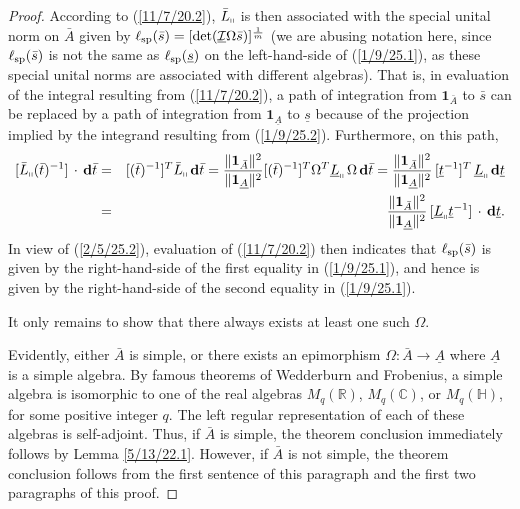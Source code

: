 \documentclass{amsart}
\theoremstyle{definition}
\numberwithin{theorem}{section}
\numberwithin{equation}{section}
\begin{document}
\begin{proof}
  According to (\ref{11/7/20.2}), $\bar{L}_{\shortparallel}$ is then associated with the special unital norm on $\bar{A}$ given by $\ell_{\rm sp}(\bar{s}) = [\text{det}(\underline{\mathcal{I}}\Omega\bar{s})]^{\frac{1}{m}}$ (we are abusing notation here, since $\ell_{\rm sp}(\bar{s})$ is not the same as $\ell_{\rm sp}(\underline{s})$ on the left-hand-side of (\ref{1/9/25.1}), as these special unital norms are associated with different algebras).  That is, in evaluation of the integral resulting from  (\ref{11/7/20.2}), a path of integration from $\mathbf{1}_{\bar{A}}$ to $\bar{s}$ can be replaced by a path of integration from $\mathbf{1}_{\underline{A}}$ to $\underline{s}$ because of the projection implied by the integrand resulting from (\ref{1/9/25.2}).   Furthermore, on this path,
  \begin{eqnarray}\nonumber  [\bar{L}_{\shortparallel}(\bar{t})^{-1}]\,\cdot\, \mathbf{d}\bar{t} &=& [(\bar{t})^{-1}]^T \bar{L}_{\shortparallel}\,\mathbf{d}\bar{t} =  \frac{\|\mathbf{1}_{\bar{A}}\|^2}{\|\mathbf{1}_{\underline{A}}\|^2}[(\bar{t})^{-1}]^T \Omega^T \underline{L}_{\shortparallel} \, \Omega \, \mathbf{d}\bar{t}  = \frac{\|\mathbf{1}_{\bar{A}}\|^2}{\|\mathbf{1}_{\underline{A}}\|^2}\,[\underline{t}^{-1}]^T\, \underline{L}_{\shortparallel}\,\mathbf{d}\underline{t} \\ &=& \frac{\|\mathbf{1}_{\bar{A}}\|^2}{\|\mathbf{1}_{\underline{A}}\|^2}\,[\underline{L}_{\shortparallel}\underline{t}^{-1}]\,\cdot\, \mathbf{d}\underline{t}.\label{2/5/25.2}\end{eqnarray}   In view of (\ref{2/5/25.2}), evaluation of (\ref{11/7/20.2}) then indicates that $\ell_{\rm sp}(\bar{s})$ is given by the right-hand-side of the first equality in (\ref{1/9/25.1}), and hence is given by the right-hand-side of the second equality in (\ref{1/9/25.1}). 
  

  It only remains to show that there always exists at least one such $\Omega$. 
  
  Evidently, either $\bar{A}$ is simple, or there exists an epimorphism $\Omega:\bar{A}\rightarrow \underline{A}$ where $ \underline{A}$ is a simple algebra.   By famous theorems of Wedderburn and Frobenius, a simple algebra is isomorphic to one of the real algebras $M_q(\mathbb{R})$, $M_q(\mathbb{C})$, or $M_q(\mathbb{H})$, for some positive integer $q$.  The left regular representation of each of these algebras is self-adjoint.  Thus, if $\bar{A}$ is simple, the theorem conclusion immediately follows by Lemma \ref{5/13/22.1}.  However, if $\bar{A}$ is not simple, the theorem conclusion follows from the first sentence of this paragraph and the first two paragraphs of this proof.
  \end{proof}
\end{document}
